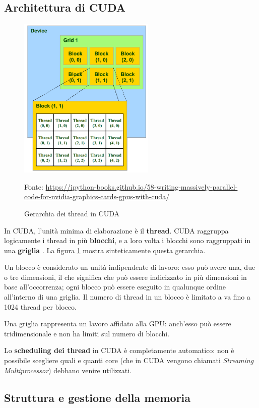 \documentclass[12pt,a4paper,openright,twoside]{report}
\newcommand{\source}[1]{\vspace{-10pt} \caption*{\scriptsize Fonte: {#1}} }
\begin{document}
\subsection{Architettura di CUDA}

\begin{figure}[h]
    \centering
    \includegraphics[width=6.5cm]{grids-and-blocks.png}
    \caption{Gerarchia dei thread in CUDA}
    \source{\url{https://ipython-books.github.io/58-writing-massively-parallel-code-for-nvidia-graphics-cards-gpus-with-cuda/}}
    \label{img:grids-and-blocks}
\end{figure}

In CUDA, l'unità minima di elaborazione è il \textbf{thread}. CUDA raggruppa logicamente i thread in più \textbf{blocchi}, e a loro volta i blocchi sono raggruppati in una \textbf{griglia} \cite{cudaguide}. La figura \ref{img:grids-and-blocks} mostra sinteticamente questa gerarchia.

Un blocco è considerato un unità indipendente di lavoro: esso può avere una, due o tre dimensioni, il che significa che può essere indicizzato in più dimensioni in base all'occorrenza; ogni blocco può essere eseguito in qualunque ordine all'interno di una griglia. Il numero di thread in un blocco è limitato a va fino a 1024 thread per blocco.

Una griglia rappresenta un lavoro affidato alla GPU: anch'esso può essere tridimensionale e non ha limiti sul numero di blocchi.

Lo \textbf{scheduling dei thread} in CUDA è completamente automatico: non è possibile scegliere quali e quanti core (che in CUDA vengono chiamati \textit{Streaming Multiprocessor}) debbano venire utilizzati.

\subsection{Struttura e gestione della memoria}
\end{document}
